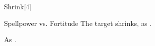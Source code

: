 \begin{spellsection}[Mass]{Shrink}[4]
    \begin{spellheader}
    \end{spellheader}
    \begin{spellcontent}
        \begin{spelltargetinginfo}
        \end{spelltargetinginfo}
        \begin{spelleffects}
            \begin{spellattack}{Spellpower vs. Fortitude}
                \spellsuccess The target shrinks, as .
            \end{spellattack}
            \spelldur \durshort \dismissable
        \end{spelleffects}
    \end{spellcontent}
    \begin{spellfooter}
        \spellnotes As .
        \miscastexplode
    \end{spellfooter}
\end{spellsection}

